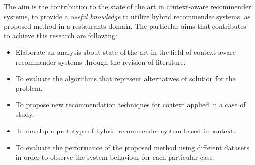 The aim is the contribution to the state of the art in context-aware
recommender systems, to provide a \textit{useful knowledge} to utilize hybrid recommender systems, as proposed method in a restaurants domain. The
particular aims that contributes to achieve this research are
following: 
\begin{itemize}  
\item Elaborate an analysis about state of the art in the field
of context-aware recommender systems through  the revision of
literature. 
\item To evaluate the algorithms that represent alternatives of 
solution for the problem. 
\item To propose new recommendation techniques for context applied 
in a case of study.  
\item To develop a prototype of hybrid recommender system based 
in context. 
\item To evaluate the performance of the proposed method using 
different datasets in order to observe the system behaviour 
for each particular case.
\end{itemize} 

